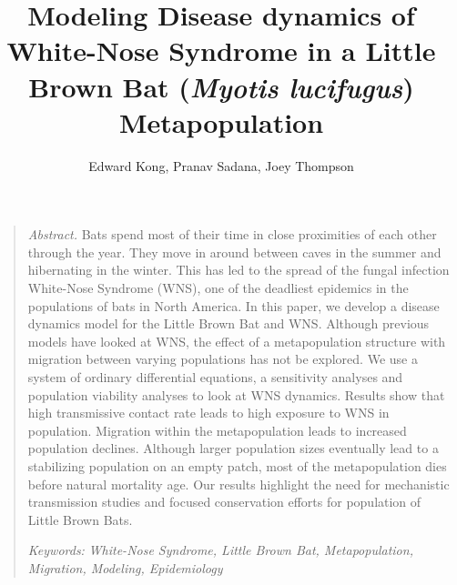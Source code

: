 \documentclass[12pt]{article}
\title{Modeling Disease dynamics of White-Nose Syndrome in a Little Brown Bat (\textit{Myotis lucifugus}) Metapopulation}
\author{
{\sc Edward Kong, Pranav Sadana, Joey Thompson}\\
}
\date{}
\newcommand\keywords{\textit{Keywords: } }{}
\begin{document}
 


\linespread{1.0}


\maketitle 

\begin{quote}
   \textit{Abstract. } Bats spend most of their time in close proximities of each other through the year. They move in around between caves in the summer and hibernating in the winter. This has led to the spread of the fungal infection White-Nose Syndrome (WNS), one of the deadliest epidemics in the populations of bats in North America. In this paper, we develop a disease dynamics model for the Little Brown Bat and WNS. Although previous models have looked at WNS, the effect of a metapopulation structure with migration between varying populations has not be explored. We use a system of ordinary differential equations, a sensitivity analyses and population viability analyses to look at WNS dynamics. Results show that high transmissive contact rate leads to high exposure to WNS in population. Migration within the metapopulation leads to increased population declines. Although larger population sizes eventually lead to a stabilizing population on an empty patch, most of the metapopulation dies before natural mortality age. Our results highlight the need for mechanistic transmission studies and focused conservation efforts for population of Little Brown Bats. 
  
  \keywords{\textit{White-Nose Syndrome, Little Brown Bat, Metapopulation, Migration, Modeling, Epidemiology}}
  
\end{quote}
\end{document}
